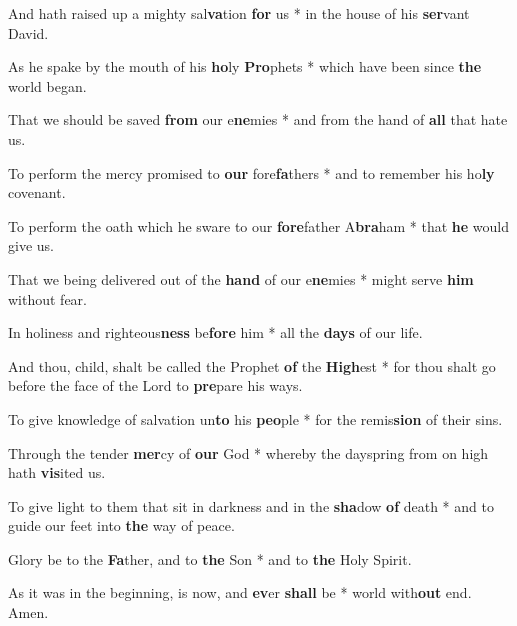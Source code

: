 \begin{multicols}{2}
	And hath raised up a mighty sal\textbf{va}tion \textbf{for} us * in the house of his \textbf{ser}vant David.
	
	As he spake by the mouth of his \textbf{ho}ly \textbf{Pro}phets * which have been since \textbf{the} world began.
	
	That we should be saved \textbf{from} our e\textbf{ne}mies * and from the hand of \textbf{all} that hate us.
	
	To perform the mercy promised to \textbf{our} fore\textbf{fa}thers * and to remember his ho\textbf{ly} covenant.
	
	To perform the oath which he sware to our \textbf{fore}father A\textbf{bra}ham * that \textbf{he} would give us.
	
	That we being delivered out of the \textbf{hand} of our e\textbf{ne}mies * might serve \textbf{him} without fear.
	
	In holiness and righteous\textbf{ness} be\textbf{fore} him * all the \textbf{days} of our life.
	
	And thou, child, shalt be called the Prophet \textbf{of} the \textbf{High}est * for thou shalt go before the face of the Lord to \textbf{pre}pare his ways.
	
	To give knowledge of salvation un\textbf{to} his \textbf{peo}ple * for the remis\textbf{sion} of their sins.
	
	Through the tender \textbf{mer}cy of \textbf{our} God * whereby the dayspring from on high hath \textbf{vis}ited us.
	
	To give light to them that sit in darkness and in the \textbf{sha}dow \textbf{of} death * and to guide our feet into \textbf{the} way of peace.
	
	Glory be to the \textbf{Fa}ther, and to \textbf{the} Son * and to \textbf{the} Holy Spirit.
	
	As it was in the beginning, is now, and \textbf{ev}er \textbf{shall} be * world with\textbf{out} end. Amen.
\end{multicols}